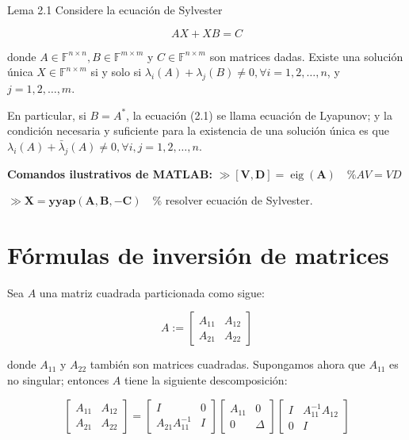 Lema 2.1 Considere la ecuación de Sylvester


\begin{equation*}
A X+X B=C \tag{2.1}
\end{equation*}


donde $A \in \mathbb{F}^{n \times n}, B \in \mathbb{F}^{m \times m}$ y $C \in \mathbb{F}^{n \times m}$ son matrices dadas. Existe una solución única $X \in \mathbb{F}^{n \times m}$ si y solo si $\lambda_{i}(A)+\lambda_{j}(B) \neq 0, \forall i=1,2, \ldots, n$, y $j=1,2, \ldots, m$.

En particular, si $B=A^{*}$, la ecuación (2.1) se llama ecuación de Lyapunov; y la condición necesaria y suficiente para la existencia de una solución única es que $\lambda_{i}(A)+\bar{\lambda}_{j}(A) \neq 0, \forall i, j=1,2, \ldots, n$.

\textbf{Comandos ilustrativos de MATLAB:}
$\gg[\mathbf{V}, \mathbf{D}]=\operatorname{eig}(\mathbf{A}) \quad \% A V=V D$

$\gg \mathbf{X}=\mathbf{y} \mathbf{y a p}(\mathbf{A}, \mathbf{B},-\mathbf{C}) \quad \%$ resolver ecuación de Sylvester.

\section{Fórmulas de inversión de matrices}
Sea $A$ una matriz cuadrada particionada como sigue:

$$
A:=\left[\begin{array}{ll}
A_{11} & A_{12} \\
A_{21} & A_{22}
\end{array}\right]
$$

donde $A_{11}$ y $A_{22}$ también son matrices cuadradas. Supongamos ahora que $A_{11}$ es no singular; entonces $A$ tiene la siguiente descomposición:

$$
\left[\begin{array}{ll}
A_{11} & A_{12} \\
A_{21} & A_{22}
\end{array}\right]=\left[\begin{array}{cc}
I & 0 \\
A_{21} A_{11}^{-1} & I
\end{array}\right]\left[\begin{array}{cc}
A_{11} & 0 \\
0 & \Delta
\end{array}\right]\left[\begin{array}{cc}
I & A_{11}^{-1} A_{12} \\
0 & I
\end{array}\right]
$$

